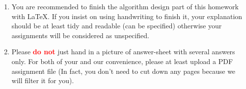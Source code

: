 \documentclass[11pt, addpoints, answers]{exam}
\newcommand{\red}[1]{\textcolor{red}{#1}}
\begin{document}
\begin{enumerate}
	\item You are recommended to finish the algorithm design part of this homework with \LaTeX. If you insist on using handwriting to finish it, your explanation should be at least tidy and readable (can be specified) otherwise your assignments will be considered as unspecified.
    \item Please \textbf{\red{do not}} just hand in a picture of answer-sheet with several answers only. For both of your and our convenience, please at least upload a PDF assignment file (In fact, you don't need to cut down any pages because we will filter it for you).
\end{enumerate}

\begin{questions}



\newpage



\newpage



\newpage



\newpage



\end{questions}
\end{document}
